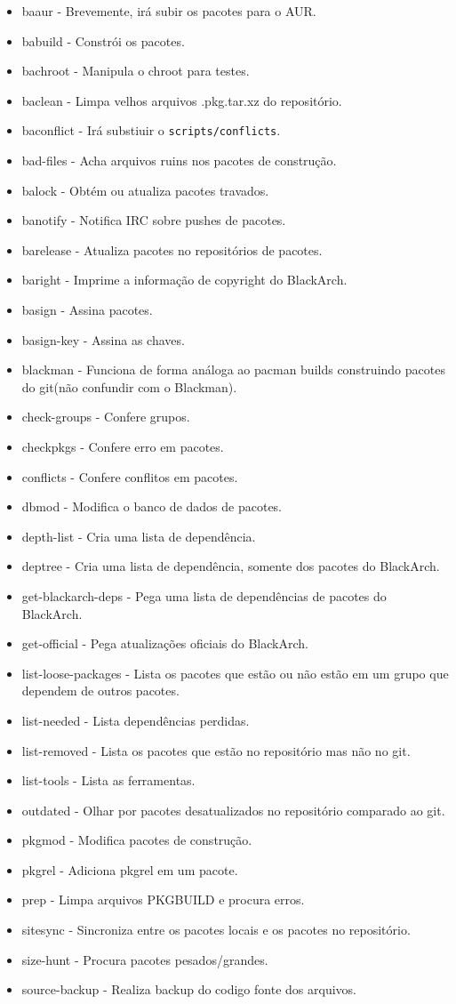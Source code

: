 \documentclass[a4paper, oneside, 11pt]{book}
\begin{document}
\begin{itemize}
\item baaur - Brevemente, irá subir os pacotes para o AUR.
\item babuild - Constrói os pacotes.
\item bachroot - Manipula o chroot para testes.
\item baclean - Limpa velhos arquivos .pkg.tar.xz do repositório.
\item baconflict - Irá substiuir o \verb|scripts/conflicts|.
\item bad-files - Acha arquivos ruins nos pacotes de construção.
\item balock - Obtém ou atualiza pacotes travados.
\item banotify - Notifica IRC sobre pushes de pacotes.
\item barelease - Atualiza pacotes no repositórios de pacotes.
\item baright - Imprime a informação de copyright do BlackArch.
\item basign - Assina pacotes.
\item basign-key - Assina as chaves.
\item blackman - Funciona de forma análoga ao pacman builds construindo pacotes do git(não confundir com o Blackman).
\item check-groups - Confere grupos.
\item checkpkgs - Confere erro em pacotes.
\item conflicts - Confere conflitos em pacotes.
\item dbmod - Modifica o banco de dados de pacotes.
\item depth-list - Cria uma lista de dependência.
\item deptree - Cria uma lista de dependência, somente dos pacotes do BlackArch.
\item get-blackarch-deps - Pega uma lista de dependências de pacotes do BlackArch.
\item get-official - Pega atualizações oficiais do BlackArch.
\item list-loose-packages - Lista os pacotes que estão ou não estão em um grupo que dependem de outros pacotes.
\item list-needed - Lista dependências perdidas.
\item list-removed - Lista os pacotes que estão no repositório mas não no git.
\item list-tools - Lista as ferramentas.
\item outdated - Olhar por pacotes desatualizados no repositório comparado ao git.
\item pkgmod - Modifica pacotes de construção.
\item pkgrel - Adiciona pkgrel em um pacote.
\item prep - Limpa arquivos PKGBUILD e procura erros.
\item sitesync - Sincroniza entre os pacotes locais e os pacotes no repositório.
\item size-hunt - Procura pacotes pesados/grandes.
\item source-backup - Realiza backup do codigo fonte dos arquivos.
\end{itemize}
\end{document}
